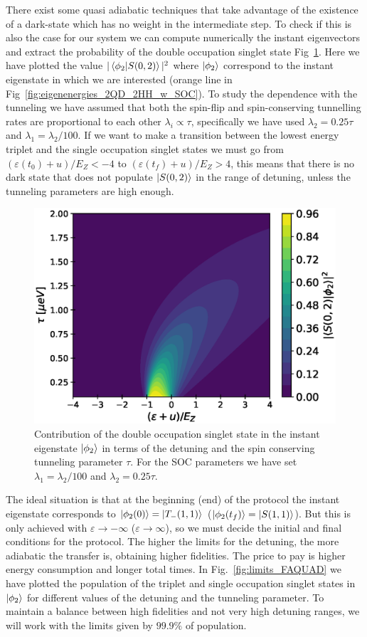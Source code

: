 \documentclass[a4paper,11pt]{article}
\begin{document}
There exist some quasi adiabatic techniques that take advantage of the existence of a dark-state which has no weight in the intermediate step. To check if this is also the case for our system we can compute numerically the instant eigenvectors and extract the probability of the double occupation singlet state Fig~\ref{fig:occupation_middle_state}. Here we have plotted the value $|\braket{\phi_2}{S(0,2)}|^2$ where $\ket{\phi_2}$ correspond to the instant eigenstate in which we are interested (orange line in Fig~\ref{fig:eigenenergies_2QD_2HH_w_SOC}). To study the dependence with the tunneling we have assumed that both the spin-flip and spin-conserving tunnelling rates are proportional to each other $\lambda_i\propto \tau$, specifically we have used $\lambda_2=0.25\tau$ and $\lambda_1=\lambda_2/100$. If we want to make a transition between the lowest energy triplet and the single occupation singlet states we must go from $(\varepsilon(t_0)+u)/E_Z<-4$ to $(\varepsilon(t_f)+u)/E_Z>4$, this means that there is no dark state that does not populate $\ket{S(0,2)}$ in the range of detuning, unless the tunneling parameters are high enough.
\begin{figure}[!htbp]
	\centering
	\includegraphics[width=0.6\linewidth]{occupation_middle_state.eps}
	\caption{Contribution of the double occupation singlet state in the instant eigenstate $\ket{\phi_2}$ in terms of the detuning and the spin conserving tunneling parameter $\tau$. For the SOC parameters we have set $\lambda_1=\lambda_2/100$ and $\lambda_2=0.25\tau$.}
	\label{fig:occupation_middle_state}
\end{figure}
The ideal situation is that at the beginning (end) of the protocol the instant eigenstate corresponds to $\ket{\phi_2(0)}=\ket{T_-(1,1)}$ ($\ket{\phi_2(t_f)}=\ket{S(1,1)}$). But this is only achieved with $\varepsilon\rightarrow -\infty$ ($\varepsilon\rightarrow \infty$), so we must decide the initial and final conditions for the protocol. The higher the limits for the detuning, the more adiabatic the transfer is, obtaining higher fidelities. The price to pay is higher energy consumption and longer total times. In Fig.~\ref{fig:limits_FAQUAD} we have plotted the population of the triplet and single occupation singlet states in $\ket{\phi_2}$ for different values of the detuning and the tunneling parameter. To maintain a balance between high fidelities and not very high detuning ranges, we will work with the limits given by $99.9\%$ of population. 
\end{document}
